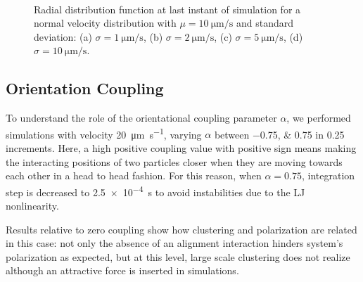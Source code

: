 \documentclass[../../master_thesis_np.tex]{subfiles}
\begin{document}
		\begin{figure}
			\centering
			\ContinuedFloat
			\\
			
			\caption{Radial distribution function at last instant of simulation for a normal velocity distribution with $\mu = \SI{10}{\um\per\second}$ and standard deviation: (a) $\sigma = \SI{1}{\um\per\second}$, (b) $\sigma = \SI{2}{\um\per\second}$, (c) $\sigma = \SI{5}{\um\per\second}$, (d) $\sigma = \SI{10}{\um\per\second}$.}
			\label{fig:lj_vdist_rdf}
		\end{figure}
		
		\subsection{Orientation Coupling}%
		To understand the role of the orientational coupling parameter $\alpha$, we performed simulations with velocity \SI{20}{\um\per\second}, varying $\alpha$ between \numlist{-0.75; 0.75} in \num{0.25} increments. 
		Here, a  high positive coupling value with positive sign means making the interacting positions of two particles closer when they are moving towards each other in a head to head fashion.
		For this reason, when $\alpha = 0.75$, integration step is decreased to \SI{2.5e-4}{\second} to avoid instabilities due to the LJ nonlinearity.
		
		Results relative to zero coupling show how clustering and polarization are related in this case: not only the absence of an alignment interaction hinders system's polarization as expected, but at this level, large scale clustering does not realize although an attractive force is inserted in simulations.
		
\end{document}
